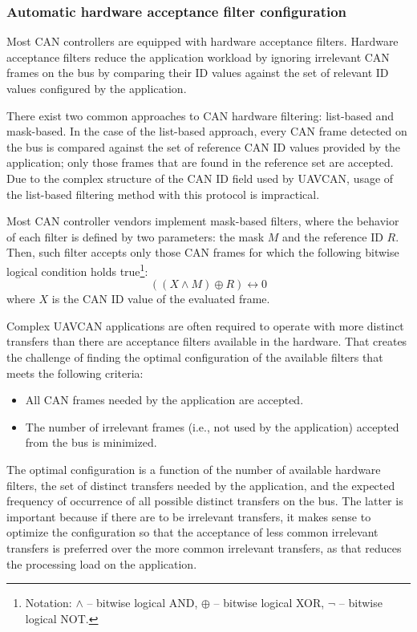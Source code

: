 \subsubsection{Automatic hardware acceptance filter configuration}

Most CAN controllers are equipped with hardware acceptance filters.
Hardware acceptance filters reduce the application workload by ignoring irrelevant CAN frames on the bus
by comparing their ID values against the set of relevant ID values configured by the application.

\begin{remark}[breakable]
    There exist two common approaches to CAN hardware filtering:
    list-based and mask-based.
    In the case of the list-based approach, every CAN frame detected on the bus is compared
    against the set of reference CAN ID values provided by the application;
    only those frames that are found in the reference set are accepted.
    Due to the complex structure of the CAN ID field used by UAVCAN,
    usage of the list-based filtering method with this protocol is impractical.

    Most CAN controller vendors implement mask-based filters,
    where the behavior of each filter is defined by two parameters: the mask $M$ and the reference ID $R$.
    Then, such filter accepts only those CAN frames for which the following bitwise logical condition holds
    true\footnote{Notation: $\land$ -- bitwise logical AND, $\oplus$ -- bitwise logical XOR,
    $\neg$ -- bitwise logical NOT.}:
    $$((X \land M) \oplus R) \leftrightarrow 0$$
    where $X$ is the CAN ID value of the evaluated frame.

    Complex UAVCAN applications are often required to operate with more distinct transfers than there are
    acceptance filters available in the hardware.
    That creates the challenge of finding the optimal configuration of the available filters that meets the
    following criteria:
    \begin{itemize}
        \item All CAN frames needed by the application are accepted.
        \item The number of irrelevant frames (i.e., not used by the application) accepted from the bus is minimized.
    \end{itemize}

    The optimal configuration is a function of the number of available hardware filters,
    the set of distinct transfers needed by the application,
    and the expected frequency of occurrence of all possible distinct transfers on the bus.
    The latter is important because if there are to be irrelevant transfers,
    it makes sense to optimize the configuration so that the acceptance of less common irrelevant transfers
    is preferred over the more common irrelevant transfers, as that reduces the processing load on the application.


\end{remark}
